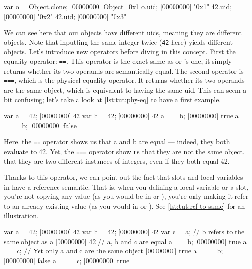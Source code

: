 \begin{urbiscript}[caption=Uids, label=lst:tut:uid]
var o = Object.clone;
[00000000] Object_0x1
o.uid;
[00000000] "0x1"
42.uid;
[00000000] "0x2"
42.uid;
[00000000] "0x3"
\end{urbiscript}

We can see here that our objects have different uids, meaning they are
different objects. Note that inputting the same integer twice
(\lstinline{42} here) yields different objects. Let's introduce new
operators before diving in this concept. First the equality operator:
\lstinline{==}. This operator is the exact same as \C or \Cxx's one, it
simply returns whether its two operands are semantically equal. The
second operator is \lstinline{===}, which is the physical equality
operator. It returns whether its two operands are the same object,
which is equivalent to having the same uid. This can seem a bit
confusing; let's take a look at \autoref{lst:tut:phy-eq} to have a first example.

\begin{urbiscript}[caption=Physical equality operator,
label=lst:tut:phy-eq]
var a = 42;
[00000000] 42
var b = 42;
[00000000] 42
a == b;
[00000000] true
a === b;
[00000000] false
\end{urbiscript}

Here, the \lstinline{==} operator shows us that a and b are equal ---
indeed, they both evaluate to 42. Yet, the \lstinline{===} operator show
us that they are not the same object, that they are two different
instances of integers, even if they both equal 42.

Thanks to this operator, we can point out the fact that slots and
local variables in \us have a reference semantic. That is, when you
defining a local variable or a slot, you're not copying any value (as
you would be in \C or \Cxx), you're only making it refer to an already
existing value (as you would in \ruby or \java). See \autoref{lst:tut:ref-to-same}
for an illustration.

\begin{urbiscript}[caption=Two references to the same object,
  label=lst:tut:ref-to-same, name=same]
var a = 42;
[00000000] 42
var b = 42;
[00000000] 42
var c = a; // b refers to the same object as a
[00000000] 42
// a, b and c are equal
a == b;
[00000000] true
a == c;
// Yet only a and c are the same object
[00000000] true
a === b;
[00000000] false
a === c;
[00000000] true
\end{urbiscript}

